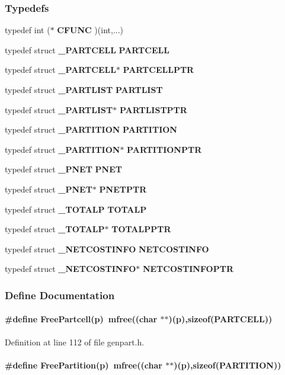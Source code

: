 \subsubsection*{Typedefs}
\begin{CompactItemize}
\item 
typedef int ($\ast$ {\bf CFUNC} )(int,...)
\item 
typedef struct {\bf \_\-PARTCELL}
 {\bf PARTCELL}
\item 
typedef struct {\bf \_\-PARTCELL}$\ast$ {\bf PARTCELLPTR}
\item 
typedef struct {\bf \_\-PARTLIST}
 {\bf PARTLIST}
\item 
typedef struct {\bf \_\-PARTLIST}$\ast$ {\bf PARTLISTPTR}
\item 
typedef struct {\bf \_\-PARTITION}
 {\bf PARTITION}
\item 
typedef struct {\bf \_\-PARTITION}$\ast$ {\bf PARTITIONPTR}
\item 
typedef struct {\bf \_\-PNET}
 {\bf PNET}
\item 
typedef struct {\bf \_\-PNET}$\ast$ {\bf PNETPTR}
\item 
typedef struct {\bf \_\-TOTALP}
 {\bf TOTALP}
\item 
typedef struct {\bf \_\-TOTALP}$\ast$ {\bf TOTALPPTR}
\item 
typedef struct {\bf \_\-NETCOSTINFO}
 {\bf NETCOSTINFO}
\item 
typedef struct {\bf \_\-NETCOSTINFO}$\ast$ {\bf NETCOSTINFOPTR}
\end{CompactItemize}


\subsubsection{Define Documentation}
\label{genpart.h_a6}
\paragraph{\setlength{\rightskip}{0pt plus 5cm}\#define Free\-Partcell(p)\ mfree((char $\ast$$\ast$)(p),sizeof({\bf PARTCELL}))}\hfill



Definition at line 112 of file genpart.h.\label{genpart.h_a8}
\paragraph{\setlength{\rightskip}{0pt plus 5cm}\#define Free\-Partition(p)\ mfree((char $\ast$$\ast$)(p),sizeof({\bf PARTITION}))}\hfill



